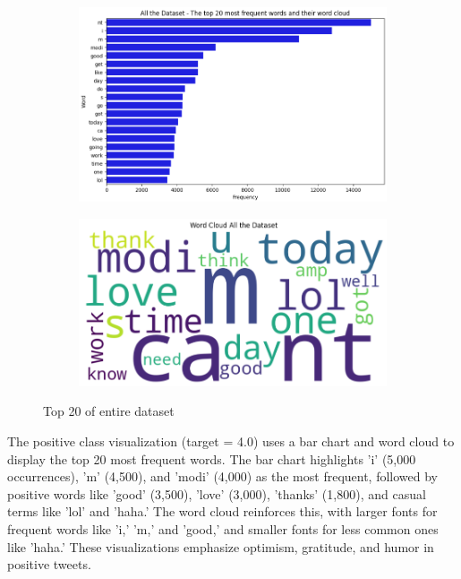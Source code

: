 \begin{figure}[H]
    \centering
    \begin{subfigure}[b]{0.48\textwidth}
        \includegraphics[width=\textwidth]{img/visualize_pic/top20.png}
    \end{subfigure}
    \begin{subfigure}[b]{0.48\textwidth}
        \includegraphics[width=\textwidth]{img/visualize_pic/top20_word_cloud.png}
    \end{subfigure}
    \caption{Top 20 of entire dataset}
\end{figure}

The positive class visualization (target = 4.0) uses a bar chart and word cloud to display the top 20 most frequent words. The bar chart highlights 'i' (5,000 occurrences), 'm' (4,500), and 'modi' (4,000) as the most frequent, followed by positive words like 'good' (3,500), 'love' (3,000), 'thanks' (1,800), and casual terms like 'lol' and 'haha.' The word cloud reinforces this, with larger fonts for frequent words like 'i,' 'm,' and 'good,' and smaller fonts for less common ones like 'haha.' These visualizations emphasize optimism, gratitude, and humor in positive tweets.


